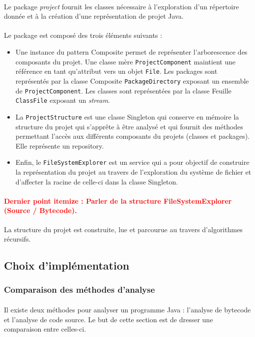\documentclass{scrartcl}
\newcommand{\TODO}[1] {
    \noindent \paragraph{\textcolor{red}{#1}}
}
\begin{document}
	\paragraph{}Le package \emph{project} fournit les classes nécessaire à l'exploration d'un répertoire donnée et à la création d'une représentation de projet Java.

	\paragraph{}Le package est composé des trois éléments suivants :
	\begin{itemize}
		\item Une instance du pattern Composite permet de représenter l’arborescence des composants du projet. Une classe mère \texttt{ProjectComponent} maintient une référence en tant qu’attribut vers un objet \texttt{File}. Les packages sont représentés par la classe Composite \texttt{PackageDirectory} exposant un ensemble de \texttt{ProjectComponent}. Les classes sont représentées par la classe Feuille \texttt{ClassFile} exposant un \emph{stream}.
		\item La \texttt{ProjectStructure} est une classe Singleton qui conserve en mémoire la structure du projet qui s’apprête à être analysé et qui fournit des méthodes permettant l’accès aux différents composants du projets (classes et packages). Elle représente un repository.
		\item Enfin, le \texttt{FileSystemExplorer} est un service qui a pour objectif de construire la représentation du projet au travers de l'exploration du système de fichier et d’affecter la racine de celle-ci dans la classe Singleton. 
	\end{itemize}
	\TODO{Dernier point itemize : Parler de la structure FileSystemExplorer (Source / Bytecode).}
    La structure du projet est construite, lue et parcourue au travers d’algorithmes récursifs.
    
    



\subsection{Choix d'implémentation}

    \subsubsection{Comparaison des méthodes d'analyse}
    \label{methodsComparison}
    \paragraph{} Il existe deux méthodes pour analyser un programme Java : l'analyse de bytecode et l'analyse de code source. Le but de cette section est de dresser une comparaison entre celles-ci.
    
\end{document}
